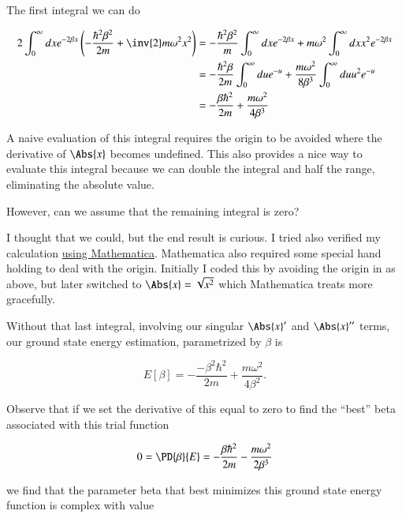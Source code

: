 The first integral we can do

\begin{align*}
2 \int_{0}^\infty dx
e^{- 2 \beta x} 
\left( -\frac{\hbar^2 \beta^2}{2m} + \inv{2} m \omega^2 x^2 \right)
&= 
-\frac{\hbar^2 \beta^2}{m} 
\int_{0}^\infty dx e^{- 2 \beta x} 
+ m \omega^2 
 \int_{0}^\infty dx x^2 e^{- 2 \beta x}  \\
&= 
-\frac{\hbar^2 \beta}{2 m} 
\int_{0}^\infty du e^{- u} 
+ \frac{m \omega^2 }{8 \beta^3}
 \int_{0}^\infty du u^2 e^{- u}  \\
&=
-\frac{\beta \hbar^2}{2m} + \frac{m \omega^2}{4 \beta^3}
\end{align*}

A naive evaluation of this integral requires the origin to be avoided where the derivative of $\Abs{x}$ becomes undefined.  This also provides a nice way to evaluate this integral because we can double the integral and half the range, eliminating the absolute value.

However, can we assume that the remaining integral is zero?

I thought that we could, but the end result is curious.  I tried also verified my calculation \href{https://github.com/peeterjoot/physicsplay/tree/master/notes/phy456/24.4.3 attempt with mathematica.nb}{using Mathematica}.  Mathematica also required some special hand holding to deal with the origin.  Initially I coded this by avoiding the origin in as above, but later switched to $\Abs{x} = \sqrt{x^2}$ which Mathematica treats more gracefully.

Without that last integral, involving our singular $\Abs{x}'$ and $\Abs{x}''$ terms, our ground state energy estimation, parametrized by $\beta$ is

\begin{equation}\label{eqn:variationHarmonicOscillator:190}
E[\beta] = -\frac{- \beta^2 \hbar^2}{2m} + \frac{m \omega^2}{4 \beta^2}.
\end{equation}

Observe that if we set the derivative of this equal to zero to find the ``best'' beta associated with this trial function

\begin{equation}\label{eqn:variationHarmonicOscillator:210}
0 = \PD{\beta}{E} = -\frac{\beta \hbar^2}{2m} - \frac{m \omega^2}{2 \beta^3}
\end{equation}

we find that the parameter beta that best minimizes this ground state energy function is complex with value

